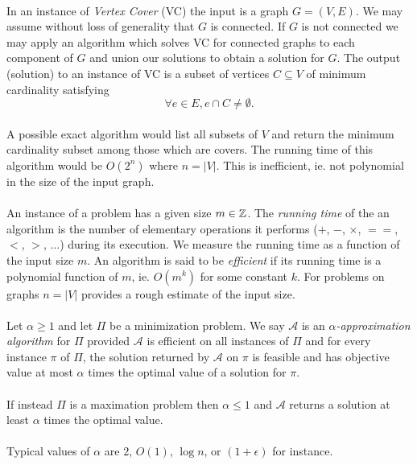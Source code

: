 \documentclass[letterpaper,12pt,oneside,onecolumn]{article}
\newcommand{\cA}{\mathcal{A}} \newcommand{\cB}{\mathcal{B}}
\begin{document}
\paragraph{}
In an instance of {\it Vertex Cover} (VC) the input is a graph $G=(V,E)$. We may assume without loss of generality that $G$ is connected. If $G$ is not connected we may apply an algorithm which solves VC for connected graphs to each component of $G$ and union our solutions to obtain a solution for $G$. The output (solution) to an instance of VC is a subset of vertices $C \subseteq V$ of minimum cardinality satisfying $$\forall e \in E, e \cap C \neq \emptyset.$$
\paragraph{}
A possible exact algorithm would list all subsets of $V$ and return the minimum cardinality subset among those which are covers. The running time of this algorithm would be $O(2^n)$ where $n = |V|$. This is inefficient, ie. not polynomial in the size of the input graph.
\paragraph{}
An instance of a problem has a given size $m \in \mathbb{Z}$. The {\it running time} of the an algorithm is the number of elementary operations it performs ($+$, $-$, $\times$, $==$, $<$, $>$, $\dots$) during its execution. We measure the running time as a function of the input size $m$. An algorithm is said to be {\it efficient} if its running time is a polynomial function of $m$, ie. $O(m^k)$ for some constant $k$. For problems on graphs $n =|V|$ provides a rough estimate of the input size.
\paragraph{}
Let $\alpha \geq 1$ and let $\Pi$ be a minimization problem. We say $\cA$ is an {\it $\alpha$-approximation algorithm} for $\Pi$ provided $\cA$ is efficient on all instances of $\Pi$ and for every instance $\pi$ of $\Pi$, the solution returned by $\cA$ on $\pi$ is feasible and has objective value at most $\alpha$ times the optimal value of a solution for $\pi$. 
\paragraph{}
If instead $\Pi$ is a maximation problem then $\alpha \leq 1$ and $\cA$ returns a solution at least $\alpha$ times the optimal value.
\paragraph{}
Typical values of $\alpha$ are $2$, $O(1)$, $\log n$, or $(1 + \epsilon)$ for instance.
\end{document}
